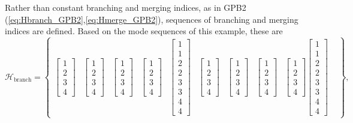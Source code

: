 Rather than constant branching and merging indices, as in GPB2 (\ref{eq:Hbranch_GPB2},\ref{eq:Hmerge_GPB2}), sequences of branching and merging indices are defined. Based on the mode sequences of this example, these are
\begin{equation} \label{eq:Hbranch_SFex2}
	\mathcal{H}_{\text{branch}} = \begin{Bmatrix}
		\begin{bmatrix} 1 \\ 2 \\ 3 \\ 4 \end{bmatrix} &
		\begin{bmatrix} 1 \\ 2 \\ 3 \\ 4 \end{bmatrix} &
		\begin{bmatrix} 1 \\ 2 \\ 3 \\ 4 \end{bmatrix} &
		\begin{bmatrix} 1 \\ 2 \\ 3 \\ 4 \end{bmatrix} &
		\begin{bmatrix} 1 \\ 1 \\ 2 \\ 2 \\ 3 \\ 3 \\ 4 \\ 4 \end{bmatrix} &
		\begin{bmatrix} 1 \\ 2 \\ 3 \\ 4 \end{bmatrix} &
		\begin{bmatrix} 1 \\ 2 \\ 3 \\ 4 \end{bmatrix} &
		\begin{bmatrix} 1 \\ 2 \\ 3 \\ 4 \end{bmatrix} &
		\begin{bmatrix} 1 \\ 2 \\ 3 \\ 4 \end{bmatrix}
		\begin{bmatrix} 1 \\ 1 \\ 2 \\ 2 \\ 3 \\ 3 \\ 4 \\ 4 \end{bmatrix} &
	\end{Bmatrix},
\end{equation}
